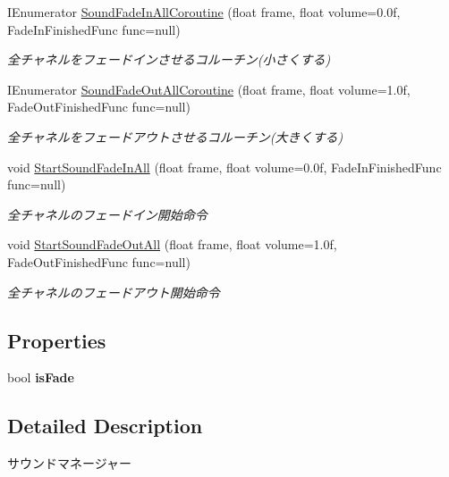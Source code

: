 \begin{DoxyCompactItemize}
I\+Enumerator \hyperlink{class_sound_manager_ae0b3882cf2d76b12e8ddbaf66d338ba6}{Sound\+Fade\+In\+All\+Coroutine} (float frame, float volume=0.\+0f, Fade\+In\+Finished\+Func func=null)
\begin{DoxyCompactList}\small\item\em 全チャネルをフェードインさせるコルーチン(小さくする) \end{DoxyCompactList}\item 
I\+Enumerator \hyperlink{class_sound_manager_af73150a7037521925d280cf2bc991c84}{Sound\+Fade\+Out\+All\+Coroutine} (float frame, float volume=1.\+0f, Fade\+Out\+Finished\+Func func=null)
\begin{DoxyCompactList}\small\item\em 全チャネルをフェードアウトさせるコルーチン(大きくする) \end{DoxyCompactList}\item 
void \hyperlink{class_sound_manager_a4008b5901ae32bf230593c35a322a9d1}{Start\+Sound\+Fade\+In\+All} (float frame, float volume=0.\+0f, Fade\+In\+Finished\+Func func=null)
\begin{DoxyCompactList}\small\item\em 全チャネルのフェードイン開始命令 \end{DoxyCompactList}\item 
void \hyperlink{class_sound_manager_a9645299a9bb7cf0056abe29e8a14e32e}{Start\+Sound\+Fade\+Out\+All} (float frame, float volume=1.\+0f, Fade\+Out\+Finished\+Func func=null)
\begin{DoxyCompactList}\small\item\em 全チャネルのフェードアウト開始命令 \end{DoxyCompactList}\end{DoxyCompactItemize}
\subsection*{Properties}
\begin{DoxyCompactItemize}
\item 
bool {\bfseries is\+Fade}\hypertarget{class_sound_manager_ad1424367cc1cbdf1c015fa0923a18c27}{}\label{class_sound_manager_ad1424367cc1cbdf1c015fa0923a18c27}

\end{DoxyCompactItemize}


\subsection{Detailed Description}
サウンドマネージャー 



